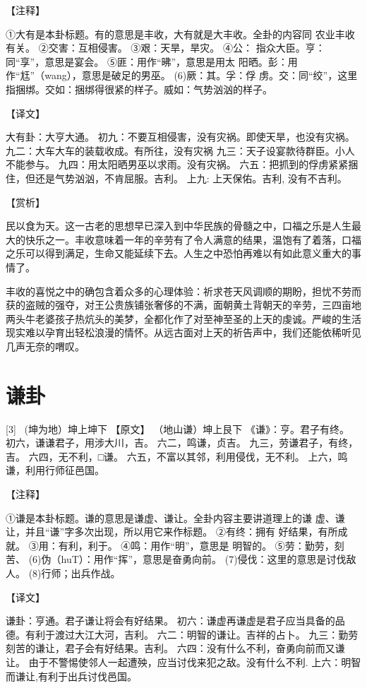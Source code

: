\documentclass[12pt,UTF8]{ctexbook}
\begin{document}
【注释】

①大有是本卦标题。有的意思是丰收，大有就是大丰收。全卦的内容同 农业丰收有关。
②交害：互相侵害。
③艰：天旱，旱灾。
④公： 指众大臣。亨：同“享”，意思是宴会。
⑤匪：用作“昲”，意思是用太 阳晒。彭：用作“尪”（wang），意思是破足的男巫。
(6)厥：其。孚：俘 虏。交：同“绞”，这里指捆绑。交如：捆绑得很紧的样子。威如：气势汹汹的样子。

【译文】

大有卦：大亨大通。
初九：不要互相侵害，没有灾祸。即使天旱，也没有灾祸。
九二：大车大车的装载收成。有所往，没有灾祸
九三：天子设宴款待群臣。小人不能参与。
九四：用太阳晒男巫以求雨。没有灾祸。
六五：把抓到的俘虏紧紧捆住，但还是气势汹汹，不肯屈服。吉利。
上九: 上天保佑。吉利, 没有不吉利。

【赏析】

民以食为天。这一古老的思想早已深入到中华民族的骨髓之中，口福之乐是人生最大的快乐之一。丰收意味着一年的辛劳有了令人满意的结果，温饱有了着落，口福之乐可以得到满足，生命又能延续下去。人生之中恐怕再难以有如此意义重大的事情了。

丰收的喜悦之中的确包含着众多的心理体验：祈求苍天风调顺的期盼，担忧不劳而获的盗贼的强夺，对王公贵族铺张奢侈的不满，面朝黄土背朝天的辛劳，三四亩地两头牛老婆孩子热炕头的美梦，全都化作了对至神至圣的上天的虔诚。严峻的生活现实难以孕育出轻松浪漫的情怀。从远古面对上天的祈告声中，我们还能依稀听见几声无奈的喟叹。

\chapter{谦卦}
[3] \ (坤为地）坤上坤下
【原文】
（地山谦）坤上艮下
《谦》：亨。君子有终。
初六，谦谦君子，用涉大川，吉。
六二，鸣谦，贞吉。
九三，劳谦君子，有终，吉。
六四，无不利，□谦。
六五，不富以其邻，利用侵伐，无不利。
上六，鸣谦，利用行师征邑国。

【注释】

①谦是本卦标题。谦的意思是谦虚、谦让。全卦内容主要讲道理上的谦 虚、谦让，并且“谦”字多次出现，所以用它来作标题。
②有终：拥有 好结果，有所成就。
③用：有利，利于。
④鸣：用作“明”，意思是 明智的。
⑤劳：勤劳，刻苦、
(6)伪（huT）：用作“挥”，意思是奋勇向前。
(7)侵伐：这里的意思是讨伐敌人。
(8)行师；出兵作战。

【译文】

谦卦：亨通。君子谦让将会有好结果。
初六：谦虚再谦虚是君子应当具备的品德。有利于渡过大江大河，吉利。
六二：明智的谦让。吉祥的占卜。
九三：勤劳刻苦的谦让，君子会有好结果。吉利。
六四：没有什么不利，奋勇向前而又谦让。 由于不警惕使邻人一起遭殃，应当讨伐来犯之敌。没有什么不利.
上六：明智而谦让,有利于出兵讨伐邑国。
\end{document}
